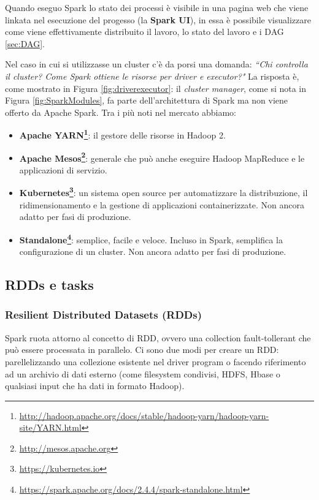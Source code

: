 \documentclass[12pt,italian]{article}
\begin{document}
Quando eseguo Spark lo stato dei processi è visibile in una pagina web che viene linkata nel esecuzione del progesso (la \textbf{Spark UI}), in essa è possibile visualizzare come viene effettivamente distribuito il lavoro, lo stato del lavoro e i DAG \ref{sec:DAG}. 

\par Nel caso in cui si utilizzasse un cluster c'è da porsi una domanda: \textit{``Chi controlla il cluster? Come Spark ottiene le risorse per driver e executor?"}
\newline La risposta è, come mostrato in Figura \ref{fig:driverexecutor}: il \textit{cluster manager}, come si nota in Figura \ref{fig:SparkModules}, fa parte dell'architettura di Spark ma non viene offerto da Apache Spark. Tra i più noti nel mercato abbiamo:
\begin{itemize}
	\item\textbf{Apache YARN\footnote{\url{http://hadoop.apache.org/docs/stable/hadoop-yarn/hadoop-yarn-site/YARN.html}}}: il gestore delle risorse in Hadoop 2.
	\item\textbf{Apache Mesos\footnote{\url{http://mesos.apache.org}}}: generale che può anche eseguire Hadoop MapReduce e le applicazioni di servizio.
	\item\textbf{Kubernetes\footnote{\url{https://kubernetes.io}}}: un sistema open source per automatizzare la distribuzione, il ridimensionamento e la gestione di applicazioni containerizzate. Non ancora adatto per fasi di produzione.
	\item\textbf{Standalone\footnote{\url{https://spark.apache.org/docs/2.4.4/spark-standalone.html}}}: semplice, facile e veloce. Incluso in Spark, semplifica la configurazione di un cluster. Non ancora adatto per fasi di produzione. 
\end{itemize}

\subsection{RDDs  e tasks}
\subsubsection{Resilient Distributed Datasets (RDDs)}\label{sec:RDD}
Spark ruota attorno al concetto di RDD, ovvero una collection fault-tollerant che può essere processata in parallelo. Ci sono due modi per creare un RDD: parellelizzando una collezione esistente nel driver program o facendo riferimento ad un archivio di dati esterno (come filesystem condivisi, HDFS, Hbase o qualsiasi input che ha dati in formato Hadoop).
\end{document}
